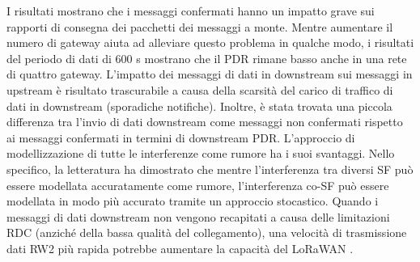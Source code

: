 \documentclass[a4paper]{report} %
\begin{document}
I risultati mostrano che i messaggi confermati hanno un impatto grave sui rapporti di consegna dei pacchetti dei messaggi a monte. Mentre aumentare il numero di gateway aiuta ad alleviare questo problema in qualche modo, i risultati del periodo di dati di 600 s mostrano che il PDR rimane basso anche in una rete di quattro gateway. L'impatto dei messaggi di dati in downstream sui messaggi in upstream è risultato trascurabile a causa della scarsità del carico di traffico di dati in downstream (sporadiche notifiche). Inoltre, è stata trovata una piccola differenza tra l'invio di dati downstream come messaggi non confermati rispetto ai messaggi confermati in termini di downstream PDR. L'approccio di modellizzazione di tutte le interferenze come rumore ha i suoi svantaggi. Nello specifico, la letteratura ha dimostrato che mentre l'interferenza tra diversi SF può essere modellata accuratamente come rumore, l'interferenza co-SF può essere modellata in modo più accurato tramite un approccio stocastico. Quando i messaggi di dati downstream non vengono recapitati a causa delle limitazioni RDC (anziché della bassa qualità del collegamento), una velocità di trasmissione dati RW2 più rapida potrebbe aumentare la capacità del LoRaWAN \cite{art:rif.49}. 
\end{document}
